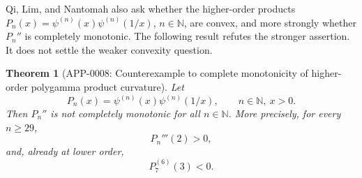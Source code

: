 \documentclass[11pt]{article}
\numberwithin{equation}{section}
\newtheorem{theorem}{Theorem}[section]
\theoremstyle{definition}
\theoremstyle{remark}
\newcommand{\N}{\mathbb N}
\newcommand{\1}{\mathbf 1}
\begin{document}
Qi, Lim, and Nantomah also ask whether the higher-order products \(P_n(x)=\psi^{(n)}(x)\psi^{(n)}(1/x)\), \(n\in\N\), are convex, and more strongly whether \(P_n''\) is completely monotonic.  The following result refutes the stronger assertion.  It does not settle the weaker convexity question.

\begin{theorem}[APP-0008: Counterexample to complete monotonicity of higher-order polygamma product curvature]
\label{thm:pn-complete-monotonicity-counterexample}
Let
\begin{equation}
\label{eq:pn-product}
P_n(x)=\psi^{(n)}(x)\psi^{(n)}(1/x),\qquad n\in\N,\ x>0.
\end{equation}
Then \(P_n''\) is not completely monotonic for all \(n\in\N\).  More precisely, for every \(n\ge29\),
\begin{equation}
\label{eq:pn-high-order-third-positive}
P_n'''(2)>0,
\end{equation}
and, already at lower order,
\begin{equation}
\label{eq:p7-sixth-negative}
P_7^{(6)}(3)<0.
\end{equation}
\end{theorem}
\end{document}
